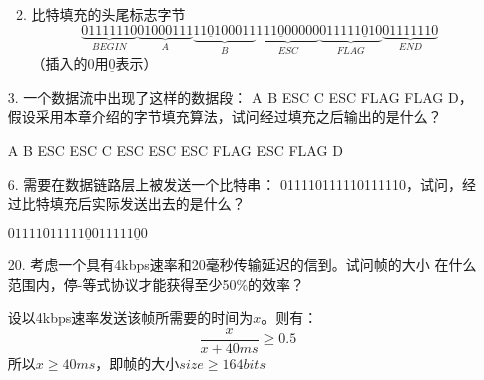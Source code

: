 \documentclass{ctexart}
\begin{document}
\begin{itemize}
\begin{enumerate}
\begin{equation*}
        \end{equation*}
        \item 比特填充的头尾标志字节
        \begin{equation*}
            \underbrace{01111110}_{BEGIN}
            \underbrace{01000111}_A
            \underbrace{11\underline{0}100011}_B
            \underbrace{111\underline{0}00000}_{ESC}
            \underbrace{011111\underline{0}10}_{FLAG}
            \underbrace{01111110}_{END}
        \end{equation*}
        （插入的$0$用$\underline{0}$表示）
    \end{enumerate}
    \item[3.] 一个数据流中出现了这样的数据段： A B ESC C ESC FLAG FLAG D，
    假设采用本章介绍的字节填充算法，试问经过填充之后输出的是什么？
    
    A B ESC ESC C ESC ESC ESC FLAG ESC FLAG D

    \item[6.] 需要在数据链路层上被发送一个比特串：
    011110111110111110，试问，经过比特填充后实际发送出去的是什么？

    $01111011111\underline{0}011111\underline{0}0$

    \item[20.] 考虑一个具有4kbps速率和20毫秒传输延迟的信到。试问帧的大小
    在什么范围内，停-等式协议才能获得至少50\%的效率？

    设以4kbps速率发送该帧所需要的时间为$x$。则有：
    \begin{equation*}
        \frac{x}{x + 40ms} \geq 0.5
    \end{equation*}
    所以$x \geq 40ms$，即帧的大小$size \geq 164 bits$
\end{itemize}
\end{document}
